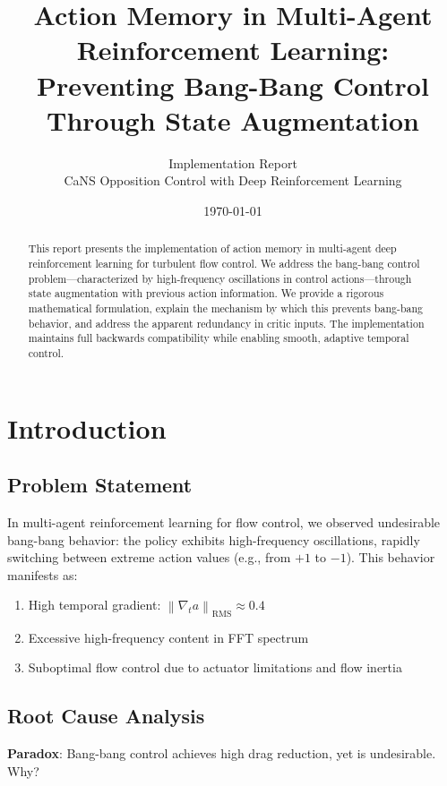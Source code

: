\documentclass[11pt,a4paper]{article}
\title{Action Memory in Multi-Agent Reinforcement Learning:\\Preventing Bang-Bang Control Through State Augmentation}
\author{Implementation Report\\CaNS Opposition Control with Deep Reinforcement Learning}
\date{\today}
\newcommand{\norm}[1]{\left\|#1\right\|}
\theoremstyle{definition}
\begin{document}
\maketitle

\begin{abstract}
This report presents the implementation of action memory in multi-agent deep reinforcement learning for turbulent flow control. We address the bang-bang control problem---characterized by high-frequency oscillations in control actions---through state augmentation with previous action information. We provide a rigorous mathematical formulation, explain the mechanism by which this prevents bang-bang behavior, and address the apparent redundancy in critic inputs. The implementation maintains full backwards compatibility while enabling smooth, adaptive temporal control.
\end{abstract}

\tableofcontents
\newpage

\section{Introduction}

\subsection{Problem Statement}

In multi-agent reinforcement learning for flow control, we observed undesirable bang-bang behavior: the policy exhibits high-frequency oscillations, rapidly switching between extreme action values (e.g., from $+1$ to $-1$). This behavior manifests as:

\begin{enumerate}
    \item High temporal gradient: $\norm{\nabla_t a}_{\text{RMS}} \approx 0.4$
    \item Excessive high-frequency content in FFT spectrum
    \item Suboptimal flow control due to actuator limitations and flow inertia
\end{enumerate}

\subsection{Root Cause Analysis}

\textbf{Paradox}: Bang-bang control achieves high drag reduction, yet is undesirable. Why?
\end{document}
